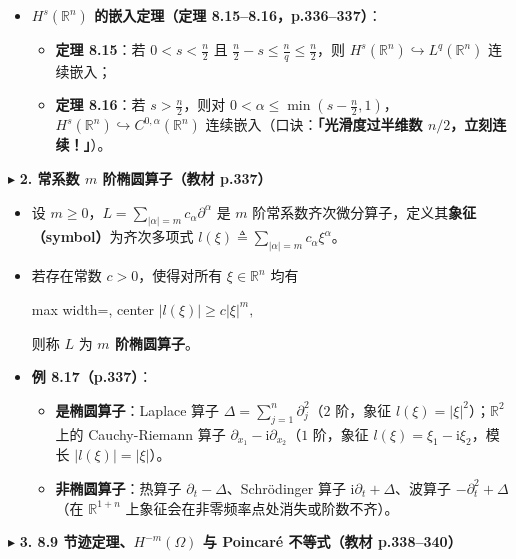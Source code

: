 \documentclass[11pt,a4paper]{article}
\providecommand{\tightlist}{\setlength{\itemsep}{1.8pt}\setlength{\parskip}{0pt}}
\newcommand{\SubSubHeading}[1]{%
  \Needspace{6.5\baselineskip}\vspace{5.5pt}\noindent
  \textcolor{AccentMain}{\scriptsize$\blacktriangleright$}\hspace{4pt}%
  {\small\bfseries\color{AccentMain}#1}\par\nopagebreak[4]\vspace{2.5pt}%
}
\newcommand{\FitDisplayMath}[1]{%
  \par\vspace{4pt}\noindent
  \begin{adjustbox}{max width=\linewidth, center}
    $\displaystyle #1$
  \end{adjustbox}
  \par\vspace{4pt}%
}
\begin{document}
\begin{itemize}
\item
  \textbf{\(H^s(\mathbb{R}^n)\) 的嵌入定理（定理 8.15--8.16，p.336--337）}：

  \begin{itemize}
  \tightlist
  \item
    \textbf{定理 8.15}：若 \(0 < s < \frac{n}{2}\) 且 \(\frac{n}{2} - s \le \frac{n}{q} \le \frac{n}{2}\)，则 \(H^s(\mathbb{R}^n) \hookrightarrow L^q(\mathbb{R}^n)\) 连续嵌入；
  \item
    \textbf{定理 8.16}：若 \(s > \frac{n}{2}\)，则对 \(0 < \alpha \le \min\!\left(s - \frac{n}{2}, 1\right)\)，\(H^s(\mathbb{R}^n) \hookrightarrow C^{0,\alpha}(\mathbb{R}^n)\) 连续嵌入（口诀：\textbf{「光滑度过半维数 \(n/2\)，立刻连续！」}）。
  \end{itemize}
\end{itemize}

\SubSubHeading{2. 常系数 \(m\) 阶椭圆算子（教材 p.337）}

\begin{itemize}
\tightlist
\item
  设 \(m \ge 0\)，\(L = \sum_{|\alpha|=m} c_\alpha \partial^\alpha\) 是 \(m\) 阶常系数齐次微分算子，定义其\textbf{象征（symbol）}为齐次多项式 \(l(\xi) \triangleq \sum_{|\alpha|=m} c_\alpha \xi^\alpha\)。
\item
  若存在常数 \(c > 0\)，使得对所有 \(\xi \in \mathbb{R}^n\) 均有 
\FitDisplayMath{|l(\xi)| \ge c|\xi|^m,}
 则称 \(L\) 为 \textbf{\(m\) 阶椭圆算子}。
\item
  \textbf{例 8.17（p.337）}：

  \begin{itemize}
  \tightlist
  \item
    \textbf{是椭圆算子}：Laplace 算子 \(\Delta = \sum_{j=1}^n \partial_j^2\)（\(2\) 阶，象征 \(l(\xi)=|\xi|^2\)）；\(\mathbb{R}^2\) 上的 Cauchy-Riemann 算子 \(\partial_{x_1} - \mathrm{i}\partial_{x_2}\)（\(1\) 阶，象征 \(l(\xi)=\xi_1-\mathrm{i}\xi_2\)，模长 \(|l(\xi)|=|\xi|\)）。
  \item
    \textbf{非椭圆算子}：热算子 \(\partial_t - \Delta\)、Schrödinger 算子 \(\mathrm{i}\partial_t + \Delta\)、波算子 \(-\partial_t^2 + \Delta\)（在 \(\mathbb{R}^{1+n}\) 上象征会在非零频率点处消失或阶数不齐）。
  \end{itemize}
\end{itemize}

\SubSubHeading{3. 8.9 节迹定理、\(H^{-m}(\Omega)\) 与 Poincaré 不等式（教材 p.338--340）}
\end{document}

